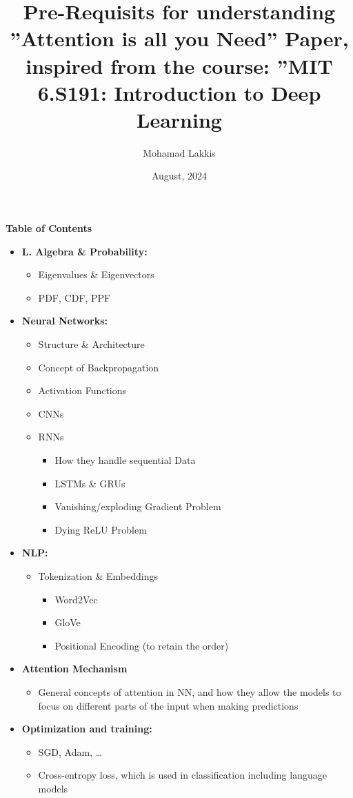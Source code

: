 \documentclass{article}
\title{Pre-Requisits for understanding ”Attention is all
you Need” Paper, inspired from the course: ”MIT
6.S191: Introduction to Deep Learning}
\author{Mohamad Lakkis}
\date{August, 2024}
\begin{document}
\maketitle
\begin{center}
  \textbf{\Large Table of Contents}
\end{center}

\begin{itemize}
  \item \textbf{L. Algebra \& Probability:}
  \begin{itemize}
      \item Eigenvalues \& Eigenvectors
      \item PDF, CDF, PPF
  \end{itemize}
  \item \textbf{Neural Networks:}
  \begin{itemize}
      \item Structure \& Architecture
      \item Concept of Backpropagation
      \item Activation Functions
      \item CNNs
      \item RNNs
      \begin{itemize}
          \item How they handle sequential Data
          \item LSTMs \& GRUs
          \item Vanishing/exploding Gradient Problem
          \item Dying ReLU Problem
      \end{itemize}
  \end{itemize}
  \item \textbf{NLP:}
  \begin{itemize}
      \item Tokenization \& Embeddings
      \begin{itemize}
          \item Word2Vec
          \item GloVe
          \item Positional Encoding (to retain the order)
      \end{itemize}
  \end{itemize}
  \item \textbf{Attention Mechanism}
  \begin{itemize}
      \item General concepts of attention in NN, and how they allow the models to focus on different parts of the input when making predictions
  \end{itemize}
  \item \textbf{Optimization and training:}
  \begin{itemize}
      \item SGD, Adam, \dots
      \item Cross-entropy loss, which is used in classification including language models
  \end{itemize}
\end{itemize}
\end{document}
